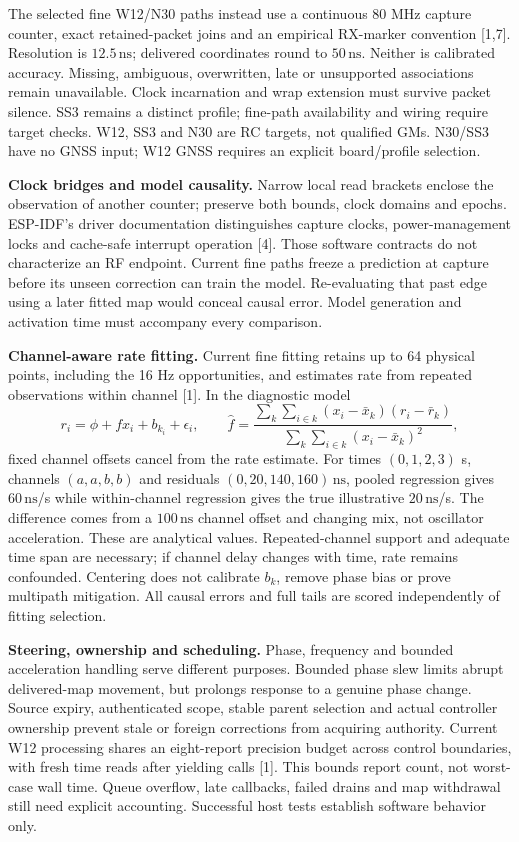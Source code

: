 \documentclass[11pt,letterpaper]{article}
\newcommand{\ns}{\,\mathrm{ns}}\newcommand{\us}{\,\mu\mathrm{s}}\newcommand{\ms}{\,\mathrm{ms}}
\begin{document}
The selected fine W12/N30 paths instead use a continuous 80 MHz capture counter, exact retained-packet joins and an empirical RX-marker convention [1,7]. Resolution is $12.5\ns$; delivered coordinates round to $50\ns$. Neither is calibrated accuracy. Missing, ambiguous, overwritten, late or unsupported associations remain unavailable. Clock incarnation and wrap extension must survive packet silence. SS3 remains a distinct profile; fine-path availability and wiring require target checks. W12, SS3 and N30 are RC targets, not qualified GMs. N30/SS3 have no GNSS input; W12 GNSS requires an explicit board/profile selection.

\textbf{Clock bridges and model causality.} Narrow local read brackets enclose the observation of another counter; preserve both bounds, clock domains and epochs. ESP-IDF's driver documentation distinguishes capture clocks, power-management locks and cache-safe interrupt operation [4]. Those software contracts do not characterize an RF endpoint. Current fine paths freeze a prediction at capture before its unseen correction can train the model. Re-evaluating that past edge using a later fitted map would conceal causal error. Model generation and activation time must accompany every comparison.

\textbf{Channel-aware rate fitting.} Current fine fitting retains up to 64 physical points, including the 16 Hz opportunities, and estimates rate from repeated observations within channel [1]. In the diagnostic model
\[
 r_i=\phi+f x_i+b_{k_i}+\epsilon_i,\qquad
 \widehat f=\frac{\sum_k\sum_{i\in k}(x_i-\bar x_k)(r_i-\bar r_k)}
 {\sum_k\sum_{i\in k}(x_i-\bar x_k)^2},
\]
fixed channel offsets cancel from the rate estimate. For times $(0,1,2,3)$ s, channels $(a,a,b,b)$ and residuals $(0,20,140,160)\ns$, pooled regression gives $60\ns$/s while within-channel regression gives the true illustrative $20\ns$/s. The difference comes from a $100\ns$ channel offset and changing mix, not oscillator acceleration. These are analytical values. Repeated-channel support and adequate time span are necessary; if channel delay changes with time, rate remains confounded. Centering does not calibrate $b_k$, remove phase bias or prove multipath mitigation. All causal errors and full tails are scored independently of fitting selection.

\textbf{Steering, ownership and scheduling.} Phase, frequency and bounded acceleration handling serve different purposes. Bounded phase slew limits abrupt delivered-map movement, but prolongs response to a genuine phase change. Source expiry, authenticated scope, stable parent selection and actual controller ownership prevent stale or foreign corrections from acquiring authority. Current W12 processing shares an eight-report precision budget across control boundaries, with fresh time reads after yielding calls [1]. This bounds report count, not worst-case wall time. Queue overflow, late callbacks, failed drains and map withdrawal still need explicit accounting. Successful host tests establish software behavior only.
\end{document}

